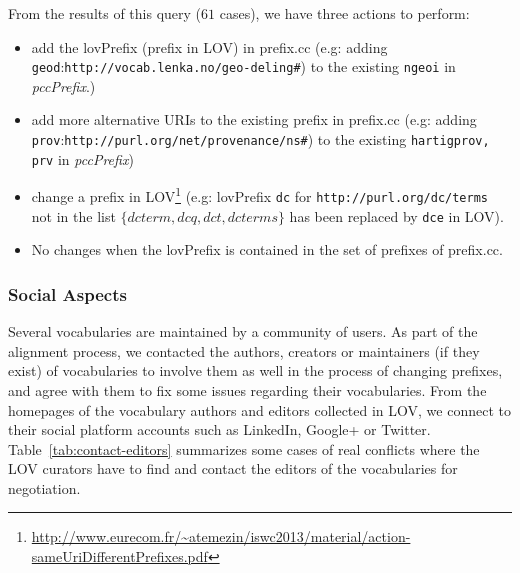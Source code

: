 From the results of this query ($61$ cases), we have three actions to perform:
\begin{itemize}
  \item add the lovPrefix (prefix in LOV) in prefix.cc (e.g: adding \texttt{geod}:\texttt{http://vocab.lenka.no/geo-deling\#}) to the existing \texttt{ngeoi} in \textit{pccPrefix}.)
  \item add more alternative URIs to the existing prefix in prefix.cc (e.g: adding \texttt{prov}:\texttt{http://purl.org/net/provenance/ns\#}) to the existing \texttt{hartigprov, prv} in \textit{pccPrefix})
  \item change a prefix in LOV\footnote{\url{http://www.eurecom.fr/~atemezin/iswc2013/material/action-sameUriDifferentPrefixes.pdf}} (e.g: lovPrefix \texttt{dc} for \texttt{http://purl.org/dc/terms} not in the list $\{dcterm, dcq, dct, dcterms\}$ has been replaced by \texttt{dce} in LOV).
  \item No changes when the lovPrefix is contained in the set of prefixes of prefix.cc.
\end{itemize}

\subsubsection{Social Aspects} \label{sec: social}
Several vocabularies are maintained by a community of users. As part of the alignment process, we contacted the authors, creators or maintainers (if they exist) of vocabularies to involve them as well in the process of changing prefixes, and agree with them to fix some issues regarding their vocabularies. From the homepages of the vocabulary authors and editors collected in LOV, we connect to their social platform accounts such as LinkedIn, Google+ or Twitter. Table~\ref{tab:contact-editors} summarizes some cases of real conflicts where the LOV curators have to find and contact the editors of the vocabularies for negotiation.

